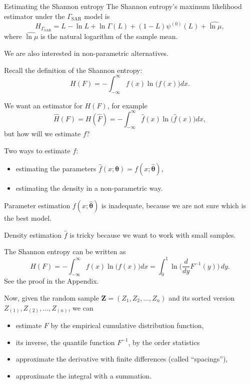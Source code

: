 \documentclass[table,aspectratio=169]{beamer}
\begin{document}
\begin{frame}[allowframebreaks]{Estimating the Shannon entropy}
The Shannon entropy's maximum likelihood estimator under the $\Gamma_{\text{SAR}}$ model is
$$
\widehat{H_{\Gamma_{\text{SAR}}}} = L -\ln L+\ln\Gamma(L)+(1-L)\psi^{(0)}(L) + \widehat{\ln \mu},
$$
where $\widehat{\ln \mu}$ is the natural logarithm of the sample mean.

We are also interested in non-parametric alternatives.

Recall the definition of the Shannon entropy:
\begin{equation*}
	H(F) = -\int_{-\infty}^\infty f(x) \ln\big(f(x)\big) dx.
\end{equation*}

We want an estimator for $H(F)$, for example
$$
\widehat{H}(F) = H(\widehat{F}) = -\int_{-\infty}^\infty \widehat{f}(x) \ln\big(\widehat{f}(x)\big) dx,
$$
but how will we estimate $f$?

Two ways to estimate $f$:
\begin{itemize}
	\item estimating the parameters $\widehat{f}(x;\bm\theta) = f(x;\widehat{\bm \theta})$,
	\item estimating the density in a non-parametric way.
\end{itemize}

Parameter estimation $f(x;\widehat{\bm \theta})$ is \alert{inadequate}, because we are not sure which is the best model.

Density estimation $\widehat{f}$ is \alert{tricky} because we want to work with small samples.

\framebreak

The Shannon entropy can be written as
$$
H(F) = 
-\int_{-\infty}^\infty f(x) \ln\big(f(x)\big) dx =
\int_{0}^{1} \ln \Big( \frac{d}{dy} F^{-1}(y) \Big) \, dy.
$$
See the proof in the Appendix.

Now, given the random sample $\bm Z=(Z_1,Z_2,\dots,Z_n)$ and its sorted version $Z_{(1)},Z_{(2)},\dots,Z_{(n)}$, we can 
\begin{itemize}
	\item estimate $F$ by the empirical cumulative distribution function,
	\item its inverse, the quantile function $F^{-1}$, by the \alert{order statistics}
	\item approximate the derivative with finite differences (called \alert{``spacings''}),
	\item approximate the integral with a \alert{summation}.
\end{itemize}


\end{frame}
\end{document}
